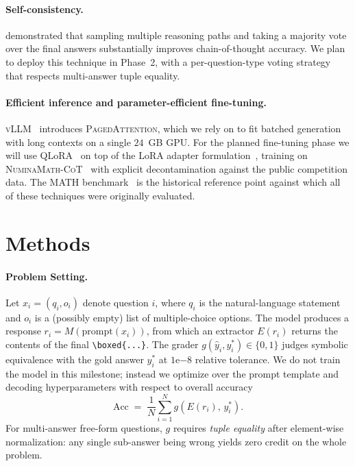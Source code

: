 \documentclass{article}
\begin{document}
\paragraph{Self-consistency.}
\citet{wang2023selfconsistency} demonstrated that sampling multiple
reasoning paths and taking a majority vote over the final answers
substantially improves chain-of-thought accuracy. We plan to deploy
this technique in Phase~2, with a per-question-type voting strategy
that respects multi-answer tuple equality.

\paragraph{Efficient inference and parameter-efficient fine-tuning.}
\textsc{vLLM}~\citep{kwon2023vllm} introduces \textsc{PagedAttention},
which we rely on to fit batched generation with long contexts on a
single $24$~GB GPU. For the planned fine-tuning phase we will use
QLoRA~\citep{dettmers2023qlora} on top of the LoRA adapter
formulation~\citep{hu2022lora}, training on
\textsc{NuminaMath-CoT}~\citep{numina2024} with explicit decontamination
against the public competition data. The
\textsc{MATH} benchmark~\citep{hendrycks2021math} is the historical
reference point against which all of these techniques were originally
evaluated.


\section{Methods}
\label{sec:methods}

\paragraph{Problem Setting.}
Let $x_i = (q_i, o_i)$ denote question $i$, where $q_i$ is the
natural-language statement and $o_i$ is a (possibly empty) list of
multiple-choice options. The model produces a response
$r_i = M(\mathrm{prompt}(x_i))$, from which an extractor $E(r_i)$
returns the contents of the final \verb|\boxed{...}|. The grader
$g(\hat{y}_i, y_i^*) \in \{0,1\}$ judges symbolic equivalence with the
gold answer $y_i^*$ at $1\mathrm{e}{-8}$ relative tolerance. We do not
train the model in this milestone; instead we optimize over the prompt
template and decoding hyperparameters with respect to overall accuracy
\[
\mathrm{Acc} \;=\; \frac{1}{N}\sum_{i=1}^{N} g\!\left(E(r_i),\, y_i^*\right).
\]
For multi-answer free-form questions, $g$ requires \emph{tuple equality}
after element-wise normalization: any single sub-answer being wrong
yields zero credit on the whole problem.
\end{document}
